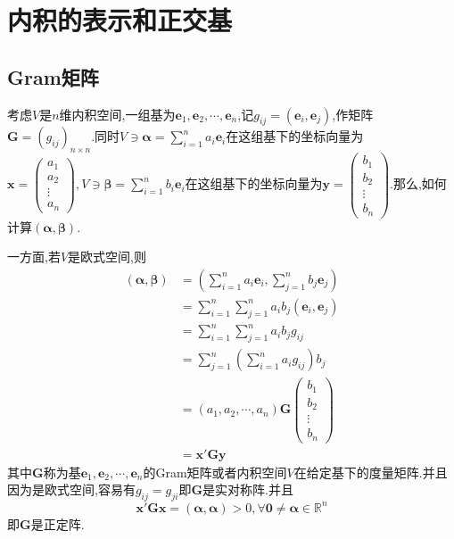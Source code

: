 \section{内积的表示和正交基}
\subsection{Gram矩阵}
考虑$V$是$n$维内积空间,一组基为$\bm{e}_1,\bm{e}_2,\cdots,\bm{e}_n$,记$g_{ij}=\left(\bm{e}_i,\bm{e}_j\right)$,作矩阵$\bm{G}=\left(g_{ij}\right)_{n\times n}$.同时$\displaystyle V\ni\bm{\alpha}=\sum_{i=1}^{n}a_i\bm{e}_i$在这组基下的坐标向量为$\displaystyle\bm{x}=\begin{pmatrix}
    a_1\\a_2\\\vdots\\a_n
\end{pmatrix},V\ni\bm{\beta}=\sum_{i=1}^{n}b_i\bm{e}_i$在这组基下的坐标向量为$\displaystyle\bm{y}=\begin{pmatrix}
    b_1\\b_2\\\vdots\\b_n
\end{pmatrix}$.那么,如何计算$\left(
    \bm{\alpha},\bm{\beta}
\right)$.

一方面,若$V$是欧式空间,则\begin{align*}
    \left(
        \bm{\alpha},\bm{\beta}
    \right)&=\left(
        \sum_{i=1}^{n}a_i\bm{e}_i,\sum_{j=1}^{n}b_j\bm{e}_j
    \right)\\
    &=\sum_{i=1}^{n}\sum_{j=1}^{n}a_ib_j\left(
        \bm{e}_i,\bm{e}_j
    \right)\\
    &=\sum_{i=1}^{n}\sum_{j=1}^{n}a_ib_jg_{ij}\\
    &=\sum_{j=1}^{n}\left(
        \sum_{i=1}^{n}a_ig_{ij}
    \right)b_j\\
    &=\left(
        a_1,a_2,\cdots,a_n
    \right)\bm{G}\begin{pmatrix}
        b_1\\b_2\\\vdots\\b_n
    \end{pmatrix}\\
    &=\bm{x}'\bm{G}\bm{y}
\end{align*}其中$\bm{G}$称为基$\bm{e}_1,\bm{e}_2,\cdots,\bm{e}_n$的Gram矩阵或者内积空间$V$在给定基下的度量矩阵.并且因为是欧式空间,容易有$g_{ij}=g_{ji}$即$\bm{G}$是实对称阵.并且\[
\bm{x}'\bm{Gx}=\left(
    \bm{\alpha},\bm{\alpha}
\right)>0,\forall\bm{0}\neq\bm{\alpha}\in \mathbb{R}^n
\]即$\bm{G}$是正定阵.

